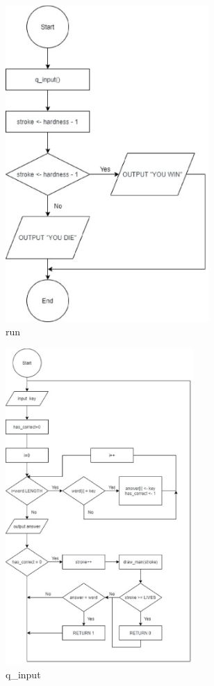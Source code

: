\documentclass{article}
\begin{document}
        \begin{figure}[htbp]
            \centering
            \includegraphics[height = 12cm]{flowchart/run.eps}
            \caption{run}
        \end{figure}

        \begin{figure}[htbp]
            \centering
            \includegraphics[height = 12cm]{flowchart/q_input.eps}
            \caption{q\_input}
        \end{figure}
\end{document}
